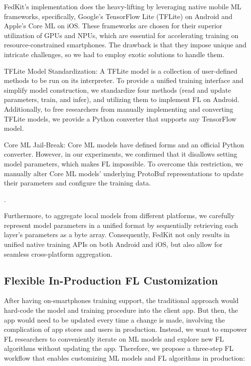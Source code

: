 \documentclass[letterpaper]{article} %
\begin{document}
FedKit's implementation does the heavy-lifting by leveraging
native mobile ML frameworks, specifically,
Google's TensorFlow Lite (TFLite) on Android and Apple's Core ML on iOS.
These frameworks are chosen for their superior utilization of GPUs and NPUs,
which are essential for accelerating training on resource-constrained smartphones.
The drawback is that they impose unique and intricate challenges,
so we had to employ exotic solutions to handle them.
\begin{enumerate*}[label=\arabic*)]
    \item TFLite Model Standardization:
        A TFLite model is a collection of user-defined methods to be run on
        its interpreter.
        To provide a unified training interface and simplify model construction,
        we standardize four methods
        (read and update parameters, train, and infer),
        and utilizing them to implement FL on Android.
        Additionally, to free researchers from manually implementing and
        converting TFLite models,
        we provide a Python converter that supports any TensorFlow model.
    \item Core ML Jail-Break:
        Core ML models have defined forms and an official Python converter.
        However, in our experiments, we confirmed that
        it disallows setting model parameters,
        which makes FL impossible.
        To overcome this restriction, we manually alter
        Core ML models' underlying ProtoBuf representations to
        update their parameters and configure the training data.
\end{enumerate*}.

Furthermore, to aggregate local models from different platforms,
we carefully represent model parameters in a unified format by
sequentially retrieving each layer's parameters as a byte array.
Consequently,
FedKit not only results in unified native training APIs on
both Android and iOS, but also
allow for seamless cross-platform aggregation.

\subsection{Flexible In-Production FL Customization}
\newcommand{\model}{$M$}
\newcommand{\fs}{$S_\mathrm F$}
After having on-smartphones training support,
the traditional approach would hard-code the model and training procedure
into the client app.
But then, the app would need to be updated every time a change is made,
involving the complication of app stores and users in production.
Instead,
we want to empower FL researchers to conveniently iterate on ML models and
explore new FL algorithms
without updating the app.
Therefore, we propose a three-step FL workflow that
enables customizing ML models and FL algorithms in production:
\end{document}
